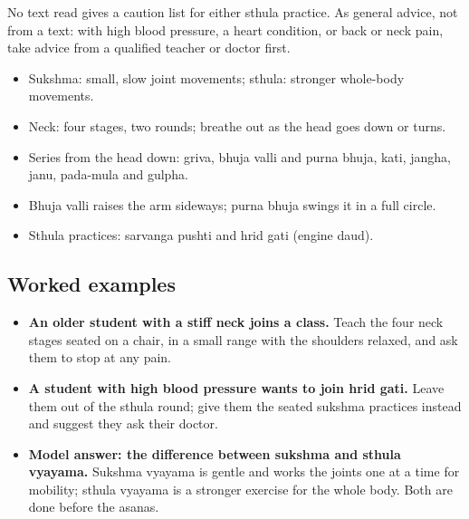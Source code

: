 
\begin{caution}
No text read gives a caution list for either sthula practice. As general advice, not from a text: with high blood pressure, a heart condition, or back or neck pain, take advice from a qualified teacher or doctor first.
\end{caution}

\begin{recall}
\begin{itemize}
\item Sukshma: small, slow joint movements; sthula: stronger whole-body movements.
\item Neck: four stages, two rounds; breathe out as the head goes down or turns.
\item Series from the head down: griva, bhuja valli and purna bhuja, kati, jangha, janu, pada-mula and gulpha.
\item Bhuja valli raises the arm sideways; purna bhuja swings it in a full circle.
\item Sthula practices: sarvanga pushti and hrid gati (engine daud).
\end{itemize}
\end{recall}

\subsection*{Worked examples}
\begin{itemize}
\item \textbf{An older student with a stiff neck joins a class.} Teach the four neck stages seated on a chair, in a small range with the shoulders relaxed, and ask them to stop at any pain.
\item \textbf{A student with high blood pressure wants to join hrid gati.} Leave them out of the sthula round; give them the seated sukshma practices instead and suggest they ask their doctor.
\item \textbf{Model answer: the difference between sukshma and sthula vyayama.} Sukshma vyayama is gentle and works the joints one at a time for mobility; sthula vyayama is a stronger exercise for the whole body. Both are done before the asanas.
\end{itemize}


